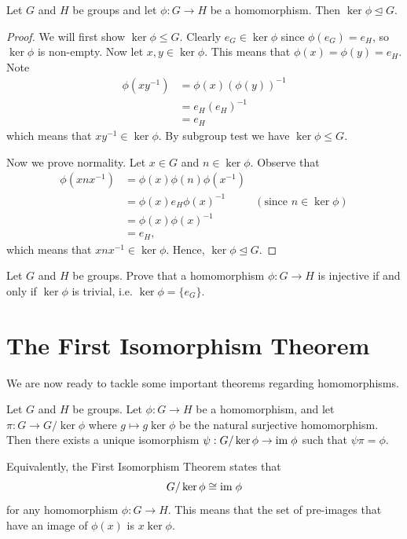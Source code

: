 \begin{proposition}\label{prop-kernel-is-normal-subgroup-of-domain}
    Let $G$ and $H$ be groups and let $\phi: G \to H$ be a homomorphism. Then $\ker\phi \unlhd G$.
\end{proposition}
\begin{proof}
    We will first show $\ker\phi\leq G$. Clearly $e_G \in \ker\phi$ since $\phi(e_G) = e_H$, so $\ker\phi$ is non-empty. Now let $x, y \in \ker\phi$. This means that $\phi(x) = \phi(y) = e_H$. Note
    \begin{align*}
        \phi(xy^{-1}) &= \phi(x)\left(\phi(y)\right)^{-1}\\
        &= e_H(e_H)^{-1}\\
        &= e_H
    \end{align*}
    which means that $xy^{-1}\in\ker\phi$. By subgroup test we have $\ker\phi\leq G$.

    Now we prove normality. Let $x \in G$ and $n \in \ker\phi$. Observe that
    \begin{align*}
        \phi(xnx^{-1}) &= \phi(x)\phi(n)\phi(x^{-1})\\
        &= \phi(x)e_H\phi(x)^{-1} & (\text{since } n \in \ker\phi)\\
        &= \phi(x)\phi(x)^{-1}\\
        &= e_H,
    \end{align*}
    which means that $xnx^{-1} \in \ker\phi$. Hence, $\ker\phi \unlhd G$.
\end{proof}

\begin{exercise}\label{exercise-trivial-kernel-means-injective}
    Let $G$ and $H$ be groups. Prove that a homomorphism $\phi: G \to H$ is injective if and only if $\ker \phi$ is trivial, i.e. $\ker \phi = \{e_G\}$.
\end{exercise}

\section{The First Isomorphism Theorem}
We are now ready to tackle some important theorems regarding homomorphisms.

\begin{theorem}[Isomorphism I]\label{thrm-isomorphism-1}
    Let $G$ and $H$ be groups. Let $\phi: G \to H$ be a homomorphism, and let $\pi: G \to G/\ker\phi$ where $g\mapsto g\ker\phi$ be the natural surjective homomorphism. Then there exists a unique isomorphism $\psi: G/\ker\phi \to \mathrm{im}\;\phi$ such that $\psi\pi = \phi$.
\end{theorem}
\begin{remark}
    Equivalently, the First Isomorphism Theorem states that
    \[
        G/\ker\phi \cong \mathrm{im}\;\phi
    \]
    for any homomorphism $\phi: G \to H$. This means that the set of pre-images that have an image of $\phi(x)$ is $x\ker\phi$.
\end{remark}

